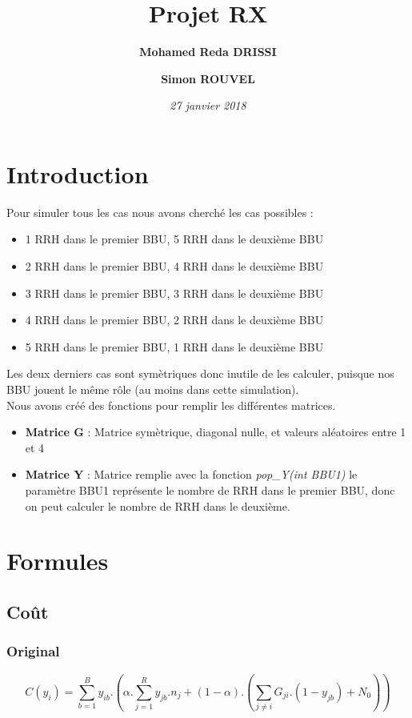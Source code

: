 \documentclass[a4paper,sans,titlepage,10pt]{article}
\title{Projet RX}
\author { \textbf{Mohamed Reda DRISSI }
			\and
		   \textbf{Simon ROUVEL}}
\date{\textit{27 janvier 2018}}
\begin{document}
\maketitle

\tableofcontents
\clearpage
\section{Introduction}
Pour simuler tous les cas nous avons cherché les cas possibles :
\begin{itemize}
	\item 1 RRH dans le premier BBU, 5 RRH dans le deuxième BBU
	\item 2 RRH dans le premier BBU, 4 RRH dans le deuxième BBU
	\item 3 RRH dans le premier BBU, 3 RRH dans le deuxième BBU
	\item 4 RRH dans le premier BBU, 2 RRH dans le deuxième BBU
	\item 5 RRH dans le premier BBU, 1 RRH dans le deuxième BBU
\end{itemize}
Les deux derniers cas sont symètriques donc inutile de les calculer, puisque nos BBU jouent
le même rôle (au moins dans cette simulation).\\
Nous avons créé des fonctions pour remplir les différentes matrices.
\begin{itemize}
	\item \textbf{Matrice G} : Matrice symètrique, diagonal nulle, et valeurs aléatoires entre 1 et 4
	\item \textbf{Matrice Y} : Matrice remplie avec la fonction \textit{pop\_Y(int BBU1)}
		le paramètre BBU1 représente le nombre de RRH dans le premier BBU, donc on peut
		calculer le nombre de RRH dans le deuxième.

\end{itemize}
\section{Formules}
\subsection{Coût}
\subsubsection{Original}
\begin{displaymath}
C(y_i)= \sum\limits_{b=1}^By_{ib}.\left(\alpha.\sum\limits_{j=1}^Ry_{jb}.n_j+(1-\alpha).(\sum\limits_{j\neq i}G_{ji}.(1-y_{jb})+N_0)\right)
\end{displaymath}
\end{document}
